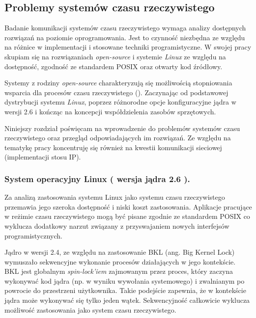 
\subsection{Problemy systemów czasu rzeczywistego}

Badanie komunikacji systemów czasu rzeczywistego wymaga analizy dostępnych rozwiązań na poziomie oprogramowania. Jest to czynność niezbędna ze względu na różnice w implementacji i stosowane techniki programistyczne. W swojej pracy skupiam się na rozwiązaniach \emph{open-source} i systemie \emph{Linux} ze względu na dostępność, zgodność ze standardem POSIX oraz otwarty kod źródłowy.

Systemy z rodziny \emph{open-source} charakteryzują się możliwością stopniowania wsparcia dla procesów czasu rzeczywistego (\cite{wiki:RTLinux}). Zaczynając od podstawowej dystrybucji systemu \emph{Linux}, poprzez różnorodne opcje konfiguracyjne jądra w wersji 2.6 i kończąc na koncepcji współdzielenia zasobów sprzętowych. 

Niniejszy rozdział poświęcam na wprowadzenie do problemów systemów czasu rzeczywistego oraz przegląd odpowiadających im rozwiązań. Ze względu na tematykę pracy koncentruję się również na kwestii komunikacji sieciowej (implementacji stosu IP). 

\subsubsection{System operacyjny Linux ( wersja jądra 2.6 ).}

Za analizą zastosowania systemu Linux jako systemu czasu rzeczywistego przemawia jego szeroka dostępność i niski koszt zastosowania. Aplikacje pracujące w reżimie czasu rzeczywistego mogą być pisane zgodnie ze standardem POSIX co wyklucza dodatkowy narzut związany z przyswajaniem nowych interfejsów programistycznych. 

Jądro w wersji 2.4, ze względu na zastosowanie BKL (ang. Big Kernel Lock) wymuszało sekwencyjne wykonanie procesów działających w jego kontekście. BKL jest globalnym \emph{spin-lock'iem} zajmowanym przez proces, który zaczyna wykonywać kod jądra (np. w wyniku wywołania systemowego) i zwalnianym po powrocie do przestrzeni użytkownika. Takie podejście zapewnia, że w kontekście jądra może wykonywać się tylko jeden wątek. Sekwencyjność całkowicie wyklucza możliwość zastosowania jako system czasu rzeczywistego. 

